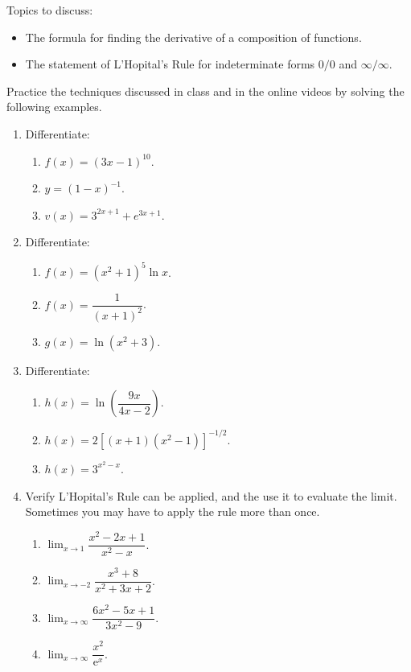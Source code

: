 \documentclass[10pt]{book}
\theoremstyle{definition}
\theoremstyle{remark}
\begin{document}
\begin{large}
\noindent
Topics to discuss:
\begin{itemize}
\item The formula for finding the derivative of a composition of functions. 
\item The statement of L'Hopital's Rule for indeterminate forms $0/0$ and $\infty / \infty$.
\end{itemize}
\newpage

\noindent
Practice the techniques discussed in class and in the online videos by solving the following examples. 
\begin{enumerate}
\item Differentiate: 
\begin{enumerate} 
\item $f\left(x\right) = \left(3x-1\right)^{10}$.\vfil\vfil
\item $y = \left(1-x \right)^{-1}$.\vfil\vfil
\item $v\left(x\right) = 3^{2x+1} + e^{3x+1}$.\vfil
\end{enumerate}
\newpage

\item Differentiate: 
\begin{enumerate} 
\item $f \left(x\right) = \left(x^2 + 1\right)^5 \ln x $.\vfil\vfil
\item $f \left(x\right) = \dfrac{1}{\left(x + 1\right)^2}$.\vfil\vfil
\item $g\left(x\right) = \ln(x^2 + 3)$.\vfil
\end{enumerate}
\newpage

\item Differentiate: 
\begin{enumerate} 
\item $h\left(x\right) = \ln \left(\dfrac{9x}{4x - 2} \right)$.\vfil\vfil
\item $h\left(x\right) = 2[\left(x + 1\right)\left(x^2 - 1\right)]^{-1/2}$.\vfil\vfil
\item $h\left(x\right) = 3^{x^2-x}$.\vfil
\end{enumerate}
\newpage

\item Verify L'Hopital's Rule can be applied, and the use it to evaluate the limit. Sometimes you may have to apply the rule more than once.
\begin{enumerate} 
\item $\displaystyle\lim_{x \rightarrow 1} \dfrac{x^2 - 2x + 1}{x^2 - x}$.\vfil\vfil
\item $\displaystyle\lim_{x \rightarrow -2} \dfrac{x^3 + 8}{x^2 + 3x + 2}$.\vfil\vfil
\item $\displaystyle\lim_{x \rightarrow \infty} \dfrac{6x^2 - 5x + 1}{3x^2 - 9}$.\vfil\vfil
\item $\displaystyle\lim_{x \rightarrow \infty} \dfrac{x^{2}}{\textrm{e}^{x}}$.\vfil
\end{enumerate}
\newpage


\end{enumerate}
\end{large}
\end{document}
